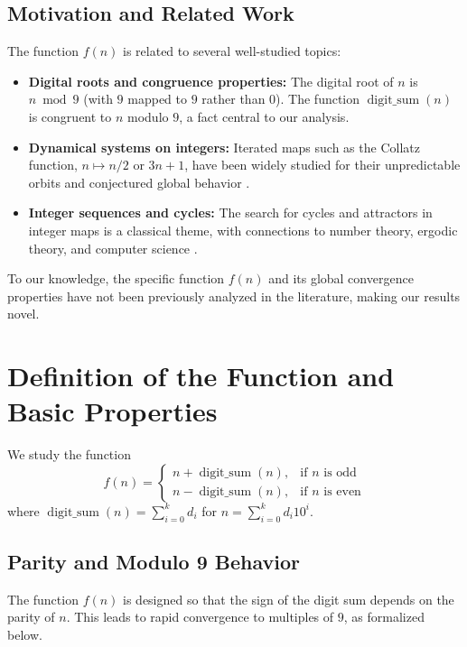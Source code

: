 \documentclass[12pt]{article}
\begin{document}
\subsection{Motivation and Related Work}
The function $f(n)$ is related to several well-studied topics:
\begin{itemize}
    \item \textbf{Digital roots and congruence properties:} The digital root of $n$ is $n \bmod 9$ (with $9$ mapped to $9$ rather than $0$). The function $\operatorname{digit\_sum}(n)$ is congruent to $n$ modulo $9$, a fact central to our analysis.
    \item \textbf{Dynamical systems on integers:} Iterated maps such as the Collatz function, $n \mapsto n/2$ or $3n+1$, have been widely studied for their unpredictable orbits and conjectured global behavior \cite{lagarias2010collatz, wirsching1998dynamical}.
    \item \textbf{Integer sequences and cycles:} The search for cycles and attractors in integer maps is a classical theme, with connections to number theory, ergodic theory, and computer science \cite{sloaneOEIS, allouche2003automatic}.
\end{itemize}
To our knowledge, the specific function $f(n)$ and its global convergence properties have not been previously analyzed in the literature, making our results novel.


\section{Definition of the Function and Basic Properties}
We study the function
\begin{equation}
    f(n) = \begin{cases}
        n + \operatorname{digit\_sum}(n), & \text{if } n \text{ is odd} \\
        n - \operatorname{digit\_sum}(n), & \text{if } n \text{ is even}
    \end{cases}
\end{equation}
where $\operatorname{digit\_sum}(n) = \sum_{i=0}^k d_i$ for $n = \sum_{i=0}^k d_i 10^i$.

\subsection{Parity and Modulo 9 Behavior}
The function $f(n)$ is designed so that the sign of the digit sum depends on the parity of $n$. This leads to rapid convergence to multiples of $9$, as formalized below.
\end{document}
